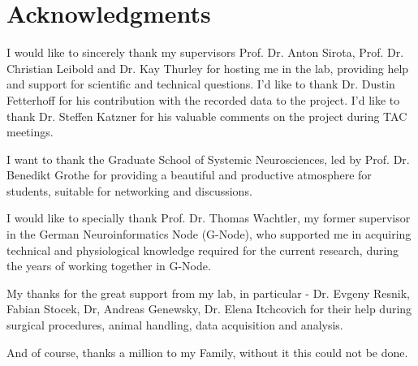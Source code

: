 \documentclass[twoside, 12pt,  footinclude=true, headinclude=true, cleardoublepage=empty]{scrbook}
\begin{document}


\frontmatter

\chapter{Acknowledgments}

I would like to sincerely thank my supervisors Prof. Dr. Anton Sirota, Prof. Dr. Christian Leibold and Dr. Kay Thurley for hosting me in the lab, providing help and support for scientific and technical questions. I'd like to thank Dr. Dustin Fetterhoff for his contribution with the recorded data to the project. I'd like to thank Dr. Steffen Katzner for his valuable comments on the project during TAC meetings.

I want to thank the Graduate School of Systemic Neurosciences, led by Prof. Dr. Benedikt Grothe for providing a beautiful and productive atmosphere for students, suitable for networking and discussions.

I would like to specially thank Prof. Dr. Thomas Wachtler, my former supervisor in the German Neuroinformatics Node (G-Node), who supported me in acquiring technical and physiological knowledge required for the current research, during the years of working together in G-Node.

My thanks for the great support from my lab, in particular - Dr. Evgeny Resnik, Fabian Stocek, Dr, Andreas Genewsky, Dr. Elena Itchcovich for their help during surgical procedures, animal handling, data acquisition and analysis.

And of course, thanks a million to my Family, without it this could not be done.

\tableofcontents

\listoffigures




\mainmatter













\printbibliography

\backmatter


\end{document}
